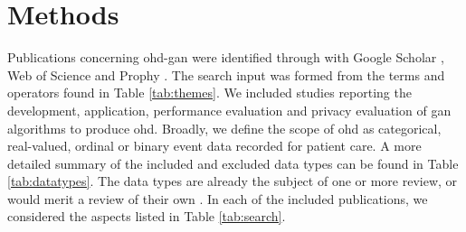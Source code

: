 \section{Methods}

    
    
    Publications concerning \gls{ohd-gan} were identified through with Google Scholar \cite{scholar}, Web of Science \cite{Clarivate} and Prophy \cite{Prophy}. The search input was formed from the terms and operators found in Table \ref{tab:themes}. We included studies reporting the development, application, performance evaluation and privacy evaluation of \gls{gan} algorithms to produce \gls{ohd}. Broadly, we define the scope of \gls{ohd} as categorical, real-valued, ordinal or binary event data recorded for patient care. A more detailed summary of the included and excluded data types can be found in Table \ref{tab:datatypes}. The data types are already the subject of one or more review, or would merit a review of their own \cite{Yi_2019, Nakata2019, Anwar_2018, Wang2020, Zhou2020}. In each of the included publications, we considered the aspects listed in Table \ref{tab:search}.\par
    
    
    
    







